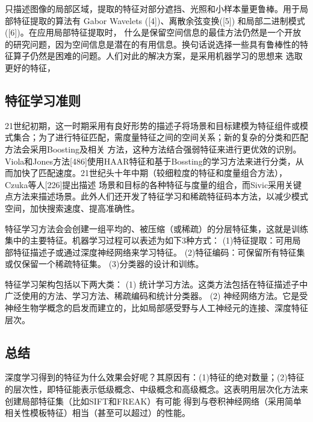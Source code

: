 只描述图像的局部区域，提取的特征对部分遮挡、光照和小样本量更鲁棒。用于局部特征提取的算法有 Gabor Wavelets ([4])、离散余弦变换([5]) 和局部二进制模式 ([6])。在应用局部特征提取时，
什么是保留空间信息的最佳方法仍然是一个开放的研究问题，因为空间信息是潜在的有用信息。换句话说选择一些具有鲁棒性的特征算子仍然是困难的问题。人们对此的解决方案，是采用机器学习的思想来
选取更好的特征，

\subsection{特征学习准则}

21世纪初期，这一时期采用有良好形势的描述子将场景和目标建模为特征组件或模式集合；为了进行特征匹配，需度量特征之间的空间关系；新的复杂的分类和匹配方法会采用Boosting及相关
方法，这种方法结合强弱特征来进行更优效的识别。Viola和Jones方法[486]使用HAAR特征和基于Bossting的学习方法来进行分类，从而加快了匹配速度。21世纪头十年中期（较细粒度的特征和度量组合方法），Czuka等人[226]提出描述
场景和目标的各种特征与度量的组合，而Sivic采用关键点方法来描述场景。此外人们还开发了特征学习和稀疏特征码本方法，以减少模式空间，加快搜索速度、提高准确性。

特征学习方法会会创建一组平均的、被压缩（或稀疏）的分层特征集，这就是训练集中的主要特征。机器学习过程可以表述为如下3种方式：
(1)特征提取：可用局部特征描述子或通过深度神经网络来学习特征。
(2)特征编码：可保留所有特征集或仅保留一个稀疏特征集。
(3)分类器的设计和训练。

特征学习架构包括以下两大类：
(1) 统计学习方法。这类方法包括在特征描述子中广泛使用的方法、学习方法、稀疏编码和统计分类器。
(2) 神经网络方法。它是受神经生物学概念的启发而建立的，比如局部感受野与人工神经元的连接、深度特征层次。

\subsection{总结}

深度学习得到的特征为什么效果会好呢？其原因有：(1)特征的绝对数量；(2)特征的层次性，即特征能表示低级概念、中级概念和高级概念。这表明用层次化方法来创建局部特征集（比如SIFT和FREAK）有可能
得到与卷积神经网络（采用简单相关性模板特征）相当（甚至可以超过）的性能。